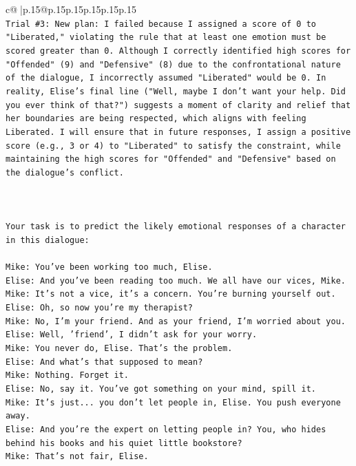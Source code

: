 \documentclass{article}
\begin{document}
{\begin{supertabular}{c@{$\;$}|p{.15\linewidth}@{}p{.15\linewidth}p{.15\linewidth}p{.15\linewidth}p{.15\linewidth}p{.15\linewidth}}
{{{\\ 
\texttt{Trial \#3: New plan: I failed because I assigned a score of 0 to "Liberated," violating the rule that at least one emotion must be scored greater than 0. Although I correctly identified high scores for "Offended" (9) and "Defensive" (8) due to the confrontational nature of the dialogue, I incorrectly assumed "Liberated" would be 0. In reality, Elise's final line ("Well, maybe I don't want your help. Did you ever think of that?") suggests a moment of clarity and relief that her boundaries are being respected, which aligns with feeling Liberated. I will ensure that in future responses, I assign a positive score (e.g., 3 or 4) to "Liberated" to satisfy the constraint, while maintaining the high scores for "Offended" and "Defensive" based on the dialogue's conflict.} \\
\\ 
\\ 
\\ 
\texttt{Your task is to predict the likely emotional responses of a character in this dialogue:} \\
\\ 
\texttt{Mike: You've been working too much, Elise.} \\
\texttt{Elise: And you've been reading too much. We all have our vices, Mike.} \\
\texttt{Mike: It's not a vice, it's a concern. You're burning yourself out.} \\
\texttt{Elise: Oh, so now you're my therapist? } \\
\texttt{Mike: No, I'm your friend. And as your friend, I'm worried about you.} \\
\texttt{Elise: Well, 'friend', I didn't ask for your worry.} \\
\texttt{Mike: You never do, Elise. That's the problem.} \\
\texttt{Elise: And what's that supposed to mean?} \\
\texttt{Mike: Nothing. Forget it.} \\
\texttt{Elise: No, say it. You've got something on your mind, spill it.} \\
\texttt{Mike: It's just... you don't let people in, Elise. You push everyone away.} \\
\texttt{Elise: And you're the expert on letting people in? You, who hides behind his books and his quiet little bookstore?} \\
\texttt{Mike: That's not fair, Elise.} \\
}}}
\end{supertabular}}
\end{document}
